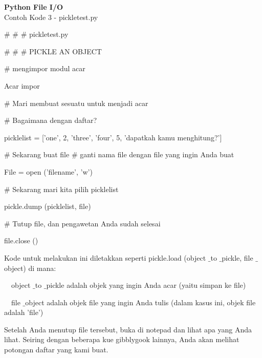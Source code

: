 \begin{center}{\fontsize{24pt}{24pt}\selectfont \textbf{Python File I/O} \\}
Contoh Kode 3 - pickletest.py

\vspace{12pt}

 $  \#  $ $  \#  $ $  \#  $ pickletest.py 
 
 $  \#  $ $  \#  $ $  \#  $ PICKLE AN OBJECT 
 
\vspace{12pt}

 $  \#  $ mengimpor modul acar 
 
Acar impor 

\vspace{12pt}
 
 $  \#  $ Mari membuat sesuatu untuk menjadi acar 
 
 $  \#  $ Bagaimana dengan daftar? 
 
picklelist = ['one', 2, 'three', 'four', 5, 'dapatkah kamu menghitung?'] 

\vspace{12pt}
 
 $  \#  $ Sekarang buat file 
 $  \#  $ ganti nama file dengan file yang ingin Anda buat 
 
File = open ('filename', 'w') 
 
\vspace{12pt}
 
 $  \#  $ Sekarang mari kita pilih picklelist 
 
pickle.dump (picklelist, file) 

\vspace{12pt}

 $  \#  $ Tutup file, dan pengawetan Anda sudah selesai 
 
file.close () 
\vspace{14pt}
 
Kode untuk melakukan ini diletakkan seperti pickle.load (object $  \_  $to $  \_  $pickle, file $  \_  $object) di mana: 

\vspace{12pt}
 
 $  $ $  $ $  $ $  $object $  \_  $to $  \_  $pickle adalah objek yang ingin Anda acar (yaitu simpan ke file) 
 
 $  $ $  $ $  $ $  $file $  \_  $object adalah objek file yang ingin Anda tulis (dalam kasus ini, objek file adalah 'file') \par
 
\vspace{12pt}
 
Setelah Anda menutup file tersebut, buka di notepad dan lihat apa yang Anda lihat. Seiring dengan beberapa kue gibblygook lainnya, Anda akan melihat potongan daftar yang kami buat. 


\end{center}
